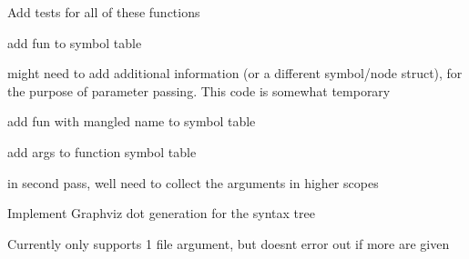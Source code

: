 
\begin{DoxyRefList}
\item[Member \mbox{\hyperlink{types_8h_addcfe7b54180f3a83e63822d7833ab61}{check\+\_\+types\+\_\+equal}} (\mbox{\hyperlink{struct_type}{Type}} $\ast$type\+\_\+1, \mbox{\hyperlink{struct_type}{Type}} $\ast$type\+\_\+2)]\label{todo__todo000014}%
%
Add tests for all of these functions  
\item[Member \mbox{\hyperlink{handlers_8h_a2a861ab8d0069fd6dd131928c88f5fc2}{handle\+\_\+cfun\+\_\+dec}} (char $\ast$name, \mbox{\hyperlink{struct_args}{Args}} $\ast$args, \mbox{\hyperlink{struct_type}{Type}} $\ast$return\+\_\+type, int line\+\_\+num)]\label{todo__todo000005}%
%
add fun to symbol table 

\label{todo__todo000004}%
%
might need to add additional information (or a different symbol/node struct), for the purpose of parameter passing. This code is somewhat temporary  
\item[Member \mbox{\hyperlink{handlers_8h_a482e0767ba1a913bfeab7df21f858aa4}{handle\+\_\+function\+\_\+def}} (char $\ast$name, \mbox{\hyperlink{struct_args}{Args}} $\ast$args, \mbox{\hyperlink{struct_type}{Type}} $\ast$return\+\_\+type, \mbox{\hyperlink{struct_symbol_table}{Symbol\+Table}} $\ast$table, \mbox{\hyperlink{struct_node}{Node}} $\ast$block, int line\+\_\+num)]\label{todo__todo000003}%
%
add fun with mangled name to symbol table 

\label{todo__todo000002}%
%
add args to function symbol table 

\label{todo__todo000001}%
%
in second pass, we\textquotesingle{}ll need to collect the arguments in higher scopes ~\newline
  
\item[Member \mbox{\hyperlink{main_8c_a0ddf1224851353fc92bfbff6f499fa97}{main}} (int argc, char $\ast$argv\mbox{[}\mbox{]})]\label{todo__todo000007}%
%
Implement Graphviz dot generation for the syntax tree 

\label{todo__todo000006}%
%
Currently only supports 1 file argument, but doesn\textquotesingle{}t error out if more are given 


\end{DoxyRefList}
